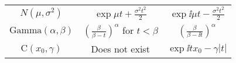 \documentclass[../../../main.tex]{subfiles}
\begin{document}
\begin{center}
\begin{tabular}{|c|c|c|}
    $N(\mu,\sigma^2)$            & $\displaystyle \exp{\mu t+\frac{\sigma^2t^2}{2}}$                         & $\displaystyle \exp{\ii \mu t-\frac{\sigma^2t^2}{2}}$           \\
    $\text{Gamma}(\alpha,\beta)$ & $\displaystyle{\left(\frac{\beta}{\beta-t}\right)}^\alpha$  for $t<\beta$ & $\displaystyle {\left(\frac{\beta}{\beta-\ii t}\right)}^\alpha$ \\
    $\text{C}(x_0,\gamma)$       & Does not exist                                                            & $\displaystyle \exp{\ii t x_0-\gamma|t|}$                       \\
    \hline
  \end{tabular}
\end{center}
\end{document}

